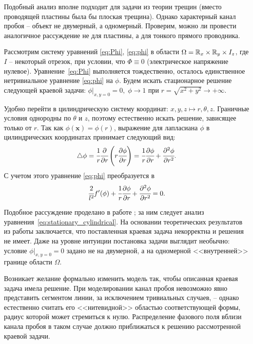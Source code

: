 Подобный анализ вполне подходит для задачи из теории трещин (вместо проводящей пластины была бы плоская трещина). Однако характерный канал пробоя -- объект не двумерный, а одномерный. Проверим, можно ли провести аналогичное рассуждение не для пластины, а для тонкого прямого проводника.

Рассмотрим систему уравнений \eqref{eq:Phi}, \eqref{eq:phi} в области $\Omega = {\mathbb{R}}_x \times {\mathbb{R}}_y \times I_z$, где $I$ -- некоторый отрезок, при условии, что $\Phi \equiv 0$ (электрическое напряжение нулевое). Уравнение~\eqref{eq:Phi} выполняется тождественно, осталось единственное нетривиальное уравнение \eqref{eq:phi} на $\phi$. Будем искать стационарное решение следующей краевой задачи: $\phi|_{x, y = 0} = 0, \; \phi \to 1$ при $r = \sqrt{x^2 + y^2} \to +\infty$.

Удобно перейти в цилиндрическую систему координат: $x, y, z \longmapsto r, \theta, z$. Граничные условия однородны по $\theta$ и $z$, поэтому естественно искать решение, зависящее только от $r$. Так как $\phi(\mathbf{x}) = \phi(r)$, выражение для лапласиана $\phi$ в цилиндрических координатах принимает следующий вид:
$$\triangle \phi = \cfrac{1}{r} \cfrac{\partial}{\partial r} \left( r \cfrac{\partial \phi}{\partial r} \right) = \cfrac{1}{r} \cfrac{\partial \phi}{\partial r} + \cfrac{\partial ^2 \phi}{\partial r^2} {\text{.}}$$
С учетом этого уравнение \eqref{eq:phi} преобразуется в
\begin{equation}
    \cfrac{2}{l^2} f'(\phi) + \cfrac{1}{r} \cfrac{\partial \phi}{\partial r} + \cfrac{\partial ^2 \phi}{\partial r^2} = 0 {\text{.}}
    \label{eq:stationary_cylindrical}
\end{equation}

Подобное рассуждение проделано в работе \cite{zipunova_higher_codimension}; за ним следует анализ уравнения~\eqref{eq:stationary_cylindrical}. На основании теоретических результатов из работы \cite{cirstea_elliptic_equations} заключается, что поставленная краевая задача некорректна и решения не имеет. Даже на уровне интуиции постановка задачи выглядит необычно: условие $\phi|_{x, y = 0} = 0$ задано не на двумерной, а на одномерной <<внутренней>> границе области $\Omega$.

Возникает желание формально изменить модель так, чтобы описанная краевая задача имела решение. При моделировании канал пробоя невозможно явно представить сегментом линии, за исключением тривиальных случаев, -- однако естественно считать его <<нитевидной>> областью соответствующей формы, радиус которой может стремиться к нулю. Распределение фазового поля вблизи канала пробоя в таком случае должно приближаться к решению рассмотренной краевой задачи.



